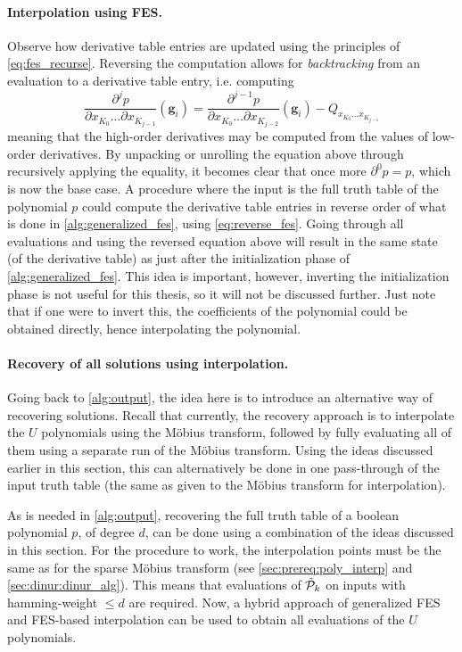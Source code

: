 \paragraph{Interpolation using FES.} Observe how derivative table entries are updated using the principles of \cref{eq:fes_recurse}. Reversing the computation allows for \textit{backtracking} from an evaluation to a derivative table entry, i.e. computing 
\begin{equation} \label{eq:reverse_fes}    
\frac{\partial^j p}{\partial x_{K_0} \dots \partial x_{K_{j - 1}}}(\mathbf{g}_i) = \frac{\partial^{j - 1} p}{\partial x_{K_0} \dots \partial x_{K_{j - 2}}}(\mathbf{g}_i) - Q_{x_{K_0} \dots x_{K_{j - 1}}}
\end{equation}
meaning that the high-order derivatives may be computed from the values of low-order derivatives. By unpacking or unrolling the equation above through recursively applying the equality, it becomes clear that once more $\partial^0 p = p$, which is now the base case. A procedure where the input is the full truth table of the polynomial $p$ could compute the derivative table entries in reverse order of what is done in \cref{alg:generalized_fes}, using \cref{eq:reverse_fes}. Going through all evaluations and using the reversed equation above will result in the same state (of the derivative table) as just after the initialization phase of \cref{alg:generalized_fes}. This idea is important, however, inverting the initialization phase is not useful for this thesis, so it will not be discussed further. Just note that if one were to invert this, the coefficients of the polynomial could be obtained directly, hence interpolating the polynomial.

\paragraph{Recovery of all solutions using interpolation.} Going back to \cref{alg:output}, the idea here is to introduce an alternative way of recovering solutions. Recall that currently, the recovery approach is to interpolate the $U$ polynomials using the Möbius transform, followed by fully evaluating all of them using a separate run of the Möbius transform. Using the ideas discussed earlier in this section, this can alternatively be done in one pass-through of the input truth table (the same as given to the Möbius transform for interpolation).

As is needed in \cref{alg:output}, recovering the full truth table of a boolean polynomial $p$, of degree $d$, can be done using a combination of the ideas discussed in this section. For the procedure to work, the interpolation points must be the same as for the sparse Möbius transform (see \cref{sec:prereq:poly_interp} and \cref{sec:dinur:dinur_alg}). This means that evaluations of $\Tilde{\mathcal{P}}_k$ on inputs with hamming-weight $\leq d$ are required. Now, a hybrid approach of generalized FES and FES-based interpolation can be used to obtain all evaluations of the $U$ polynomials. 

